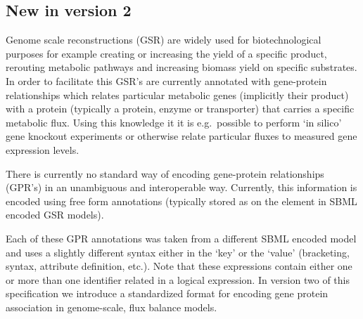 \subsection{New in version 2}
\label{intro-ga}
Genome scale reconstructions (GSR) are widely used for biotechnological purposes for example creating or increasing the yield of a specific product, rerouting metabolic pathways and increasing biomass yield on specific substrates. In order to facilitate this GSR's are currently annotated with gene-protein relationships which relates particular metabolic genes (implicitly their product) with a protein (typically a protein, enzyme or transporter) that carries a specific metabolic flux. Using this knowledge it it is e.g.~possible to perform `in silico' gene knockout experiments or otherwise relate particular fluxes to measured gene expression levels.

There is currently no standard way of encoding gene-protein relationships (GPR's) in an unambiguous and interoperable way. Currently, this information is encoded using free form annotations (typically stored as \Notes on the \Reaction element in SBML encoded GSR models).
%

Each of these GPR annotations was taken from a different SBML encoded model and uses a slightly different syntax either in the `key' or the `value' (bracketing, syntax, attribute definition, etc.). Note that these expressions contain either one or more than one identifier related in a logical expression. In version two of this specification we introduce a standardized format for encoding gene protein association in genome-scale, flux balance models.

